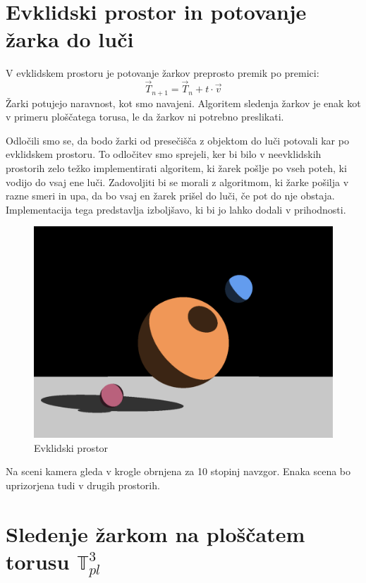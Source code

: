 \documentclass[titlepage]{article}
\begin{document}
\section{Evklidski prostor in potovanje žarka do luči}

V evklidskem prostoru je potovanje žarkov preprosto premik po premici: 
\[ \vec{T}_{n+1} = \vec{T}_{n} + t \cdot \vec{v} \]
Žarki potujejo naravnost, kot smo navajeni. Algoritem sledenja žarkov je enak 
kot v primeru ploščatega torusa, le da žarkov ni potrebno preslikati. 

Odločili smo se, da bodo žarki od presečišča z objektom do luči potovali kar po evklidskem prostoru. 
To odločitev smo sprejeli, ker bi bilo v neevklidskih prostorih zelo težko implementirati algoritem, 
ki žarek pošlje po vseh poteh, ki vodijo do vsaj ene luči. Zadovoljiti bi se morali z algoritmom,
ki žarke pošilja v razne smeri in upa, da bo vsaj en žarek prišel do luči, če pot do nje obstaja. 
Implementacija tega predstavlja izboljšavo, ki bi jo lahko dodali v prihodnosti.

\begin{figure}[H]
  \centering
  \includegraphics[width=0.8\linewidth]{Images/Euclidean_24mm.png}
  \caption{Evklidski prostor}
  \label{Slika:Euklidski prostor}
\end{figure}

Na sceni kamera gleda v krogle obrnjena za 10 stopinj navzgor. Enaka scena 
bo uprizorjena tudi v drugih prostorih.

\section{\texorpdfstring{Sledenje žarkom na ploščatem torusu \( \mathbb{T}_{pl}^{3} \)}{Sledenje žarkom na prostoru ploščati torusu}}
\end{document}
